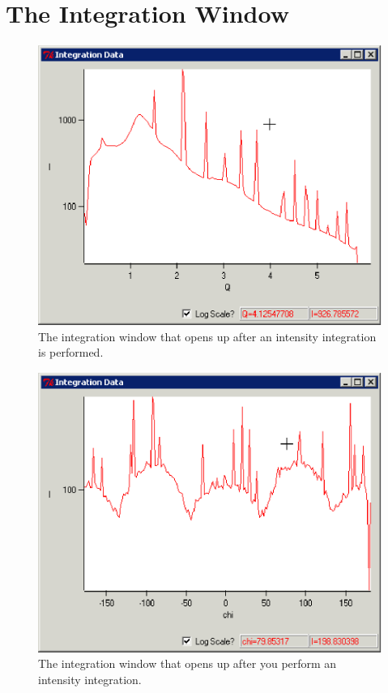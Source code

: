 \section{The Integration Window}

\begin{figure}
    \centering
    \includegraphics[scale=.75]{figures/integration_window_q.eps}
    \caption{The integration window that
    opens up after an intensity integration 
    is performed.} 
    \label{integration_window_q}
\end{figure}

\begin{figure}
    \centering
    \includegraphics[scale=.75]{figures/integration_window_chi.eps}
    \caption{The integration window that opens up after 
    you perform an intensity integration.} 
    \label{integration_window_chi}
\end{figure}

